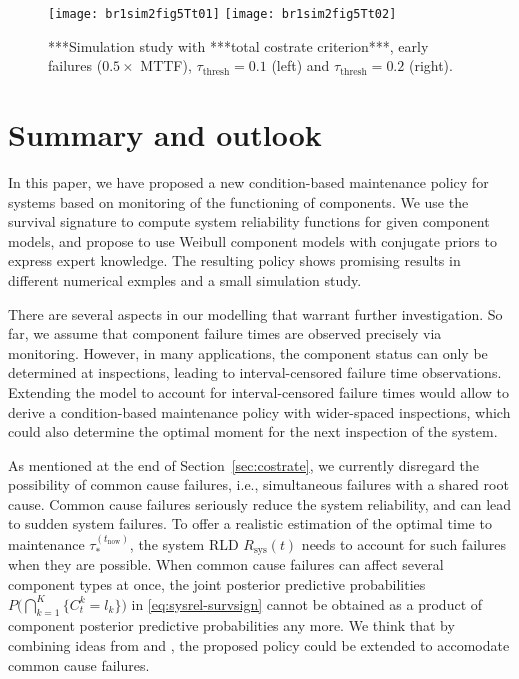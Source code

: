 \documentclass[authoryear]{elsarticle}
\newcommand{\Rsys}{R_\text{sys}}
\def\tnow{t_\text{now}}
\newcommand{\tausnow}{\tau_*^{(\tnow)}}
\newcommand{\tthresh}{\tau_{\text{thresh}}}
\begin{document}
\begin{figure}
\texttt{[image: br1sim2fig5Tt01]}
\texttt{[image: br1sim2fig5Tt02]}
\caption{***Simulation study with ***total costrate criterion***, early failures ($0.5 \times$ MTTF),
$\tthresh = 0.1$ (left) and $\tthresh = 0.2$ (right).}
\label{fig:simtotalcostrate0102}
\end{figure}
\fi


\section{Summary and outlook}
\label{sec:outlook}

In this paper, we have proposed a new condition-based maintenance policy
for systems based on monitoring of the functioning of components.
We use the survival signature to compute system reliability functions
for given component models, and propose to use Weibull component models
with conjugate priors to express expert knowledge.
The resulting policy shows promising results in
different numerical exmples and a small simulation study.

There are several aspects in our modelling that warrant further investigation.
So far, we assume that component failure times are observed precisely via monitoring.
However, in many applications, the component status can only be determined
at inspections, leading to interval-censored failure time observations.
Extending the model to account for interval-censored failure times
would allow to derive a condition-based maintenance policy with wider-spaced inspections,
which could also determine the optimal moment for the next inspection of the system.

As mentioned at the end of Section~\ref{sec:costrate},
we currently disregard the possibility of common cause failures,
i.e., simultaneous failures with a shared root cause.
Common cause failures seriously reduce the system reliability,
and can lead to sudden system failures.
To offer a realistic estimation of the optimal time to maintenance $\tausnow$,
the system RLD $\Rsys(t)$ needs to account for such failures when they are possible.
When common cause failures can affect several component types at once,
the joint posterior predictive probabilities $P\Big( \bigcap_{k=1}^K \{ C^k_t = l_k\} \Big)$ in \eqref{eq:sysrel-survsign}
cannot be obtained as a product of component posterior predictive probabilities any more.
We think that by combining ideas from \cite{2015:coolen-coolen-maturi} and \cite{Troffaes2014a},
the proposed policy could be extended to accomodate common cause failures.
\end{document}
